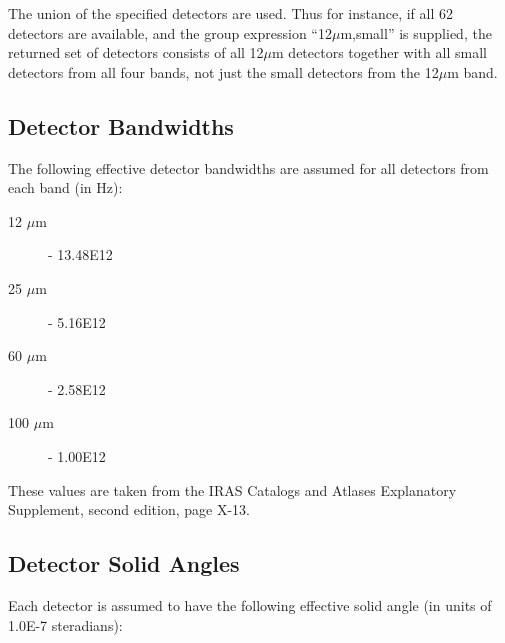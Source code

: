 \documentclass[11pt,nolof,noabs]{starlink}
\begin{document}
The union of the specified detectors are used. Thus for instance,
if all 62 detectors are available, and the group expression
``12$\mu$m,small'' is supplied, the returned set of detectors consists
of all 12$\mu$m detectors together with all small detectors from all
four bands, not just the small detectors from the 12$\mu$m band.

\subsection{Detector Bandwidths}
\label{SEC:BWID}
The following effective detector bandwidths are assumed for
all detectors from each band (in Hz):
\begin{description}
\item [12 $\mu$m] - 13.48E12
\item [25 $\mu$m] - 5.16E12
\item [60 $\mu$m] - 2.58E12
\item [100 $\mu$m] - 1.00E12
\end{description}

These values are taken from the {\small IRAS} Catalogs and Atlases
Explanatory Supplement, second edition, page X-13.

\subsection{Detector Solid Angles}
\label{SEC:SOLAN}
Each detector is assumed to have the following effective solid
angle (in units of 1.0E-7 steradians):

\small
{}
\normalsize
\end{document}
